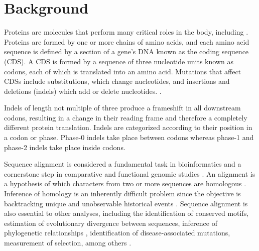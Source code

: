 \section{Background}

Proteins are molecules that perform many critical roles in the body, including
.
Proteins are formed by one or more chains of amino acids, and each amino acid
sequence is defined by a section of a gene's DNA known as the coding sequence
(CDS).
A CDS is formed by a sequence of three nucleotide units known as codons, each of
which is translated into an amino acid.
Mutations that affect CDSs include substitutions, which change nucleotides, and
insertions and deletions (indels) which add or delete nucleotides.
.

Indels of length not multiple of three produce a frameshift in all downstream
codons, resulting in a change in their reading frame and therefore a completely
different protein translation.
Indels are categorized according to their position in a codon or phase.
Phase-0 indels take place between codons whereas phase-1 and phase-2 indels
take place inside codons.


Sequence alignment is considered a fundamental task in bioinformatics and a
cornerstone step in comparative and functional genomic studies
\parencite{sequence_alignment_rosenberg_2009}.
An alignment is a hypothesis of which characters from two or more sequences are
homologous \parencite{problems_cartwright_2009}.
Inference of homology is an inherently difficult problem since the objective is
backtracking unique and unobservable historical events
\parencite{sequence_aln_morrison_2010}.
Sequence alignment is also essential to other analyses, including the
identification of conserved motifs, estimation of evolutionary divergence
between sequences, inference of phylogenetic relationships
\parencite{MSA_kumar_2007}, identification of disease-associated mutations,
measurement of selection, among others
\parencite{sequence_alignment_rosenberg_2009}.

